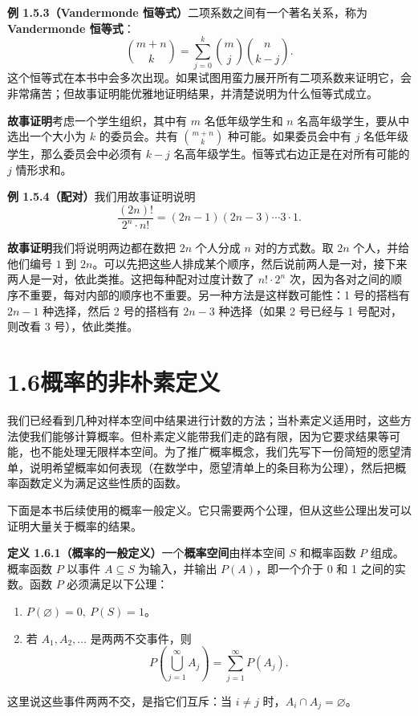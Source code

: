 \documentclass[UTF8,12pt,a4paper,fontset=fandol]{ctexart}
\begin{document}
\noindent\textbf{例 1.5.3（Vandermonde 恒等式）}\quad 二项系数之间有一个著名关系，称为\textbf{Vandermonde 恒等式}：
\[
  \binom{m+n}{k}
  =\sum_{j=0}^{k}\binom{m}{j}\binom{n}{k-j}.
\]
这个恒等式在本书中会多次出现。如果试图用蛮力展开所有二项系数来证明它，会非常痛苦；但故事证明能优雅地证明结果，并清楚说明为什么恒等式成立。

\noindent\textbf{故事证明}\quad 考虑一个学生组织，其中有 $m$ 名低年级学生和 $n$ 名高年级学生，要从中选出一个大小为 $k$ 的委员会。共有 $\binom{m+n}{k}$ 种可能。如果委员会中有 $j$ 名低年级学生，那么委员会中必须有 $k-j$ 名高年级学生。恒等式右边正是在对所有可能的 $j$ 情形求和。

\noindent\textbf{例 1.5.4（配对）}\quad 我们用故事证明说明
\[
  \frac{(2n)!}{2^n\cdot n!}=(2n-1)(2n-3)\cdots 3\cdot 1.
\]

\noindent\textbf{故事证明}\quad 我们将说明两边都在数把 $2n$ 个人分成 $n$ 对的方式数。取 $2n$ 个人，并给他们编号 $1$ 到 $2n$。可以先把这些人排成某个顺序，然后说前两人是一对，接下来两人是一对，依此类推。这把每种配对过度计数了 $n!\cdot 2^n$ 次，因为各对之间的顺序不重要，每对内部的顺序也不重要。另一种方法是这样数可能性：1 号的搭档有 $2n-1$ 种选择，然后 2 号的搭档有 $2n-3$ 种选择（如果 2 号已经与 1 号配对，则改看 3 号），依此类推。

\section*{1.6\quad 概率的非朴素定义}

我们已经看到几种对样本空间中结果进行计数的方法；当朴素定义适用时，这些方法使我们能够计算概率。但朴素定义能带我们走的路有限，因为它要求结果等可能，也不能处理无限样本空间。为了推广概率概念，我们先写下一份简短的愿望清单，说明希望概率如何表现（在数学中，愿望清单上的条目称为公理），然后把概率函数定义为满足这些性质的函数。

下面是本书后续使用的概率一般定义。它只需要两个公理，但从这些公理出发可以证明大量关于概率的结果。

\noindent\textbf{定义 1.6.1（概率的一般定义）}\quad 一个\textbf{概率空间}由样本空间 $S$ 和概率函数 $P$ 组成。概率函数 $P$ 以事件 $A\subseteq S$ 为输入，并输出 $P(A)$，即一个介于 0 和 1 之间的实数。函数 $P$ 必须满足以下公理：
\begin{enumerate}
  \item $P(\varnothing)=0,\ P(S)=1$。
  \item 若 $A_1,A_2,\ldots$ 是两两不交事件，则
  \[
    P\left(\bigcup_{j=1}^{\infty}A_j\right)
    =\sum_{j=1}^{\infty}P(A_j).
  \]
\end{enumerate}
这里说这些事件两两不交，是指它们互斥：当 $i\ne j$ 时，$A_i\cap A_j=\varnothing$。
\end{document}
